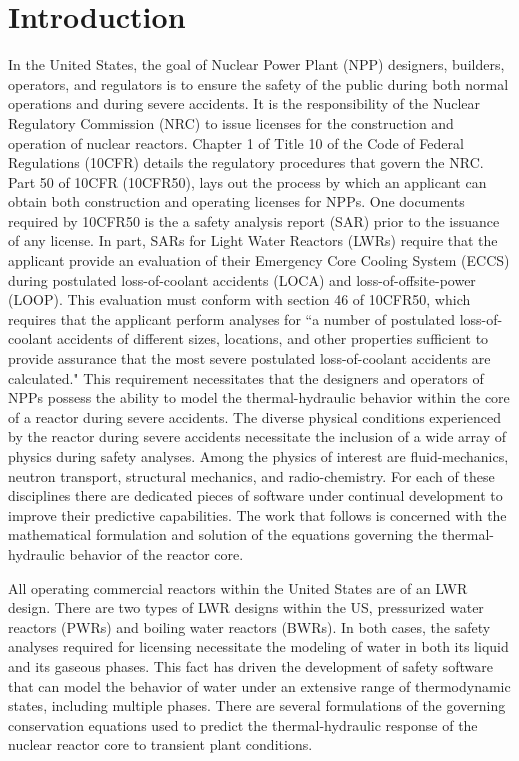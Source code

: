 \chapter{Introduction}
\label{chap:intro}
In the United States, the goal of Nuclear Power Plant (NPP) designers, builders, operators, and regulators is to ensure the safety of the public during both normal operations and during severe accidents.
It is the responsibility of the Nuclear Regulatory Commission (NRC) to issue licenses for the construction and operation of nuclear reactors.
Chapter 1 of Title 10 of the Code of Federal Regulations (10CFR) details the regulatory procedures that govern the NRC.
Part 50 of 10CFR (10CFR50), lays out the process by which an applicant can obtain both construction and operating licenses for NPPs.
One documents required by 10CFR50 is the a safety analysis report (SAR) prior to the issuance of any license.
In part, SARs for Light Water Reactors (LWRs) require that the applicant provide an evaluation of their Emergency Core Cooling System (ECCS) during postulated loss-of-coolant accidents (LOCA) and loss-of-offsite-power (LOOP).
This evaluation must conform with section 46 of 10CFR50, which requires that the applicant perform analyses for ``a number of postulated loss-of-coolant accidents of different sizes, locations, and other properties sufficient to provide assurance that the most severe postulated loss-of-coolant accidents are calculated."
This requirement necessitates that the designers and operators of NPPs possess the ability to model the thermal-hydraulic behavior within the core of a reactor during severe accidents.  
The diverse physical conditions experienced by the reactor during severe accidents necessitate the inclusion of a wide array of physics during safety analyses.
Among the physics of interest are fluid-mechanics, neutron transport, structural mechanics, and radio-chemistry.
For each of these disciplines there are dedicated pieces of software under continual development to improve their predictive capabilities.
The work that follows is concerned with the mathematical formulation and solution of the equations governing the thermal-hydraulic behavior of the reactor core.

All operating commercial reactors within the United States are of an LWR design.
There are two types of LWR designs within the US, pressurized water reactors (PWRs) and boiling water reactors (BWRs).
In both cases, the safety analyses required for licensing necessitate the modeling of water in both its liquid and its gaseous phases.
This fact has driven the development of safety software that can model the behavior of water under an extensive range of thermodynamic states, including multiple phases.
There are several formulations of the governing conservation equations used to predict the thermal-hydraulic response of the nuclear reactor core to transient plant conditions.

